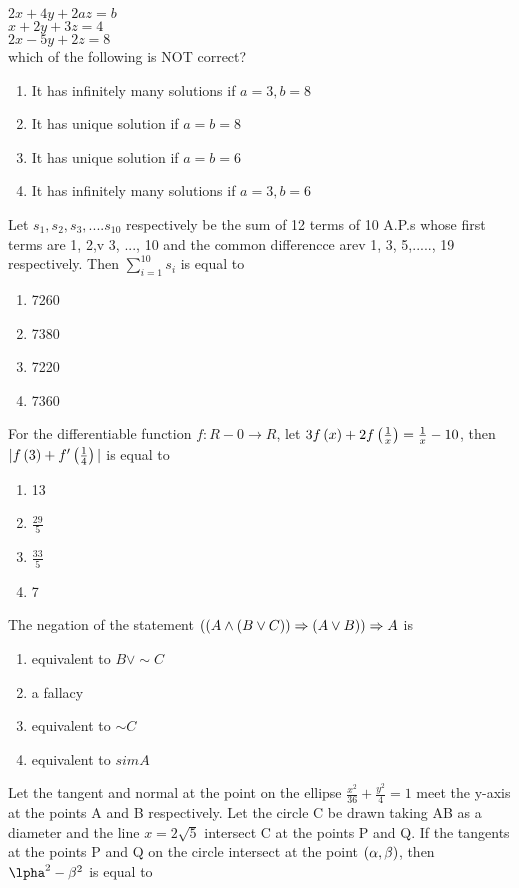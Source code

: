 $2x + 4y + 2az = b$\\
$x +  2y + 3z = 4$\\
$2x - 5y +2z = 8$\\
which of the following is NOT correct?
\hfill{}
\begin{enumerate}
    \item It has infinitely many solutions if $a=3,b=8$
    \item It has unique solution if $a=b=8$
    \item It has unique solution if $a=b=6$
    \item It has infinitely many solutions if $a=3,b=6$
\end{enumerate}
\item Let $s_1,s_2,s_3,....s_{10}$ respectively be the sum of 12 terms of 10 A.P.s whose first terms are 1, 2,v 3, ..., 10 and the common differencce arev 1, 3, 5,....., 19 respectively. Then $\sum_{i=1}^{10} s_i$ is equal to 
\hfill{}
\begin{enumerate}
    \item 7260
    \item 7380
    \item 7220
    \item 7360
\end{enumerate}
\item For the differentiable function $f:R-{0}\rightarrow R$, let $3f\left(x\right)+2f\left(\frac{1}{x}\right)=\frac{1}{x}-10$, then $|f\left(3\right)+f^{\prime}\left(\frac{1}{4}\right)|$ is equal to
\hfill{}
\begin{enumerate}
    \item 13
    \item $\frac{29}{5}$
    \item $\frac{33}{5}$
    \item 7
\end{enumerate}
\item The negation of the statement $\left(\left(A \land \left(B \lor C\right)\right) \Rightarrow \left(A \lor B\right)\right) \Rightarrow A $ is
\hfill{}
\begin{enumerate}
    \item equivalent to $ B \lor \sim C $
    \item a fallacy
    \item equivalent to $ \sim C $
    \item equivalent to $ sim A $
\end{enumerate}
\item Let the tangent and normal at the point  on the ellipse $\frac{x^2}{36}+\frac{y^2}{4}=1$ meet the y-axis at the points A and B respectively. Let the circle C be drawn taking AB as a diameter and the line $x=2\sqrt{5}$ intersect C at the points P and Q. If the tangents at the points P and Q on the circle intersect at the point $\left(\alpha,\beta\right)$, then $\lpha^2 -\beta^2$ is equal to 
